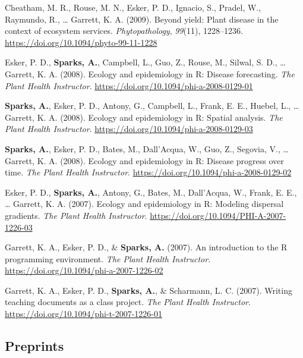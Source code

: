 \documentclass[11pt, a4paper]{awesome-cv}
\begin{document}
\leavevmode{}%
Cheatham, M. R., Rouse, M. N., Esker, P. D., Ignacio, S., Pradel, W.,
Raymundo, R., \ldots{} Garrett, K. A. (2009). Beyond yield: {Plant}
disease in the context of ecosystem services. \emph{Phytopathology},
\emph{99}(11), 1228--1236.
\url{https://doi.org/10.1094/phyto-99-11-1228}

\leavevmode{}%
Esker, P. D., \textbf{Sparks, A.}, Campbell, L., Guo, Z., Rouse, M.,
Silwal, S. D., \ldots{} Garrett, K. A. (2008). Ecology and epidemiology
in {R}: Disease forecasting. \emph{The Plant Health Instructor}.
\url{https://doi.org/10.1094/phi-a-2008-0129-01}

\leavevmode{}%
\textbf{Sparks, A.}, Esker, P. D., Antony, G., Campbell, L., Frank, E.
E., Huebel, L., \ldots{} Garrett, K. A. (2008). Ecology and epidemiology
in {R}: Spatial analysis. \emph{The Plant Health Instructor}.
\url{https://doi.org/10.1094/phi-a-2008-0129-03}

\leavevmode{}%
\textbf{Sparks, A.}, Esker, P. D., Bates, M., Dall'Acqua, W., Guo, Z.,
Segovia, V., \ldots{} Garrett, K. A. (2008). Ecology and epidemiology in
{R}: Disease progress over time. \emph{The Plant Health Instructor}.
\url{https://doi.org/10.1094/phi-a-2008-0129-02}

\leavevmode{}%
Esker, P. D., \textbf{Sparks, A.}, Antony, G., Bates, M., Dall'Acqua,
W., Frank, E. E., \ldots{} Garrett, K. A. (2007). Ecology and
epidemiology in {R}: Modeling dispersal gradients. \emph{The Plant
Health Instructor}. \url{https://doi.org/10.1094/PHI-A-2007-1226-03}

\leavevmode{}%
Garrett, K. A., Esker, P. D., \& \textbf{Sparks, A.} (2007). An
introduction to the {R} programming environment. \emph{The Plant Health
Instructor}. \url{https://doi.org/10.1094/phi-a-2007-1226-02}

\leavevmode{}%
Garrett, K. A., Esker, P. D., \textbf{Sparks, A.}, \& Scharmann, L. C.
(2007). Writing teaching documents as a class project. \emph{The Plant
Health Instructor}. \url{https://doi.org/10.1094/phi-t-2007-1226-01}

\endgroup

\hypertarget{preprints}{%
\subsection{Preprints}\label{preprints}}
\end{document}
